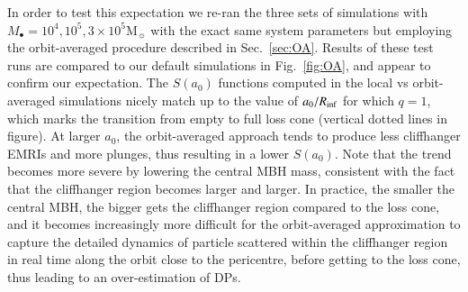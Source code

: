 \documentclass[desactivate]{aa}
\newcommand{\lb}[1]{\textcolor{orange}{#1}}
\newcommand{\as}[1]{\textcolor{red}{AS: #1}}
\begin{document}
    In order to test this expectation we re-ran the three sets of simulations with $M_\bullet = 10^4, 10^5, 3\times10^5 \mathrm{M}_\sun$ with the exact same system parameters but employing the orbit-averaged procedure described in Sec.~\ref{sec:OA}. Results of these test runs are compared to our default simulations in Fig.~\ref{fig:OA}, and appear to confirm our expectation. The $S(a_0)$ functions computed in the local vs orbit-averaged simulations nicely match up to the value of $a_0/R_{\rm inf}$ for which $q=1$, which marks the transition from empty to full loss cone (vertical dotted lines in figure). At larger $a_0$, the orbit-averaged approach tends to produce less cliffhanger EMRIs and more plunges, thus resulting in a lower $S(a_0)$. Note that the trend becomes more severe by lowering the central MBH mass, consistent with the fact that the cliffhanger region becomes larger and larger. In practice, the smaller the central MBH, the bigger gets the cliffhanger region compared to the loss cone, and it becomes increasingly more difficult for the orbit-averaged approximation to capture the detailed dynamics of particle scattered within the cliffhanger region in real time along the orbit close to the pericentre, before getting to the loss cone, thus leading to an over-estimation of DPs. 
        
\end{document}
